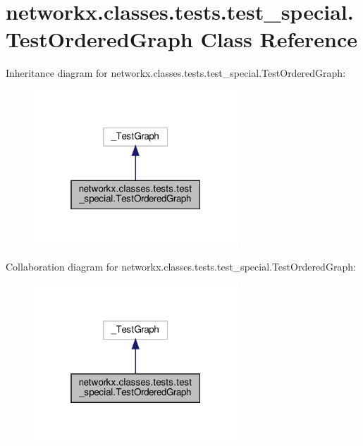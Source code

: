 \hypertarget{classnetworkx_1_1classes_1_1tests_1_1test__special_1_1TestOrderedGraph}{}\section{networkx.\+classes.\+tests.\+test\+\_\+special.\+Test\+Ordered\+Graph Class Reference}
\label{classnetworkx_1_1classes_1_1tests_1_1test__special_1_1TestOrderedGraph}


Inheritance diagram for networkx.\+classes.\+tests.\+test\+\_\+special.\+Test\+Ordered\+Graph\+:
\nopagebreak
\begin{figure}[H]
\begin{center}
\leavevmode
\includegraphics[width=217pt]{classnetworkx_1_1classes_1_1tests_1_1test__special_1_1TestOrderedGraph__inherit__graph}
\end{center}
\end{figure}


Collaboration diagram for networkx.\+classes.\+tests.\+test\+\_\+special.\+Test\+Ordered\+Graph\+:
\nopagebreak
\begin{figure}[H]
\begin{center}
\leavevmode
\includegraphics[width=217pt]{classnetworkx_1_1classes_1_1tests_1_1test__special_1_1TestOrderedGraph__coll__graph}
\end{center}
\end{figure}
